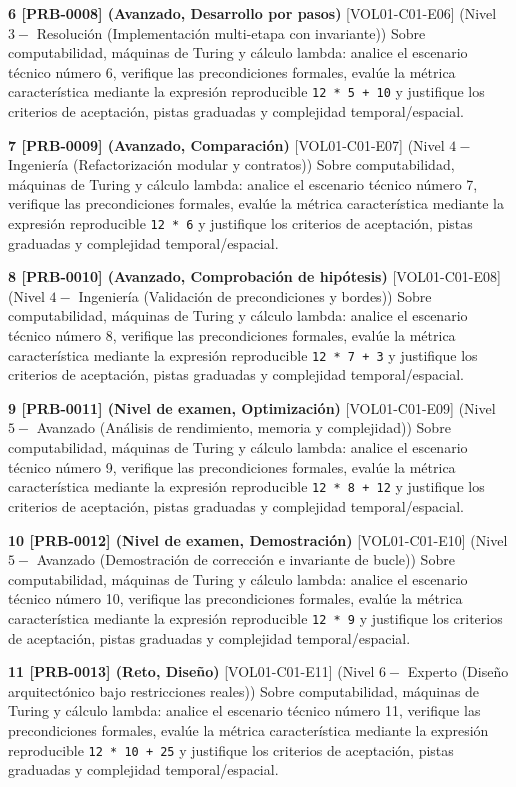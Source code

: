\documentclass{book}
\begin{document}
\begin{tcolorbox}[title={Ejercicios}, studiumworked, breakable]
\noindent\textbf{6 [PRB-0008] (Avanzado, Desarrollo por pasos)}
[VOL01-C01-E06] (Nivel \(3 -\) Resolución (Implementación multi-etapa con invariante)) Sobre computabilidad, máquinas de Turing y cálculo lambda: analice el escenario técnico número 6, verifique las precondiciones formales, evalúe la métrica característica mediante la expresión reproducible \texttt{12 * 5 + 10} y justifique los criterios de aceptación, pistas graduadas y complejidad temporal/espacial.

\noindent\textbf{7 [PRB-0009] (Avanzado, Comparación)}
[VOL01-C01-E07] (Nivel \(4 -\) Ingeniería (Refactorización modular y contratos)) Sobre computabilidad, máquinas de Turing y cálculo lambda: analice el escenario técnico número 7, verifique las precondiciones formales, evalúe la métrica característica mediante la expresión reproducible \texttt{12 * 6} y justifique los criterios de aceptación, pistas graduadas y complejidad temporal/espacial.

\noindent\textbf{8 [PRB-0010] (Avanzado, Comprobación de hipótesis)}
[VOL01-C01-E08] (Nivel \(4 -\) Ingeniería (Validación de precondiciones y bordes)) Sobre computabilidad, máquinas de Turing y cálculo lambda: analice el escenario técnico número 8, verifique las precondiciones formales, evalúe la métrica característica mediante la expresión reproducible \texttt{12 * 7 + 3} y justifique los criterios de aceptación, pistas graduadas y complejidad temporal/espacial.

\noindent\textbf{9 [PRB-0011] (Nivel de examen, Optimización)}
[VOL01-C01-E09] (Nivel \(5 -\) Avanzado (Análisis de rendimiento, memoria y complejidad)) Sobre computabilidad, máquinas de Turing y cálculo lambda: analice el escenario técnico número 9, verifique las precondiciones formales, evalúe la métrica característica mediante la expresión reproducible \texttt{12 * 8 + 12} y justifique los criterios de aceptación, pistas graduadas y complejidad temporal/espacial.

\noindent\textbf{10 [PRB-0012] (Nivel de examen, Demostración)}
[VOL01-C01-E10] (Nivel \(5 -\) Avanzado (Demostración de corrección e invariante de bucle)) Sobre computabilidad, máquinas de Turing y cálculo lambda: analice el escenario técnico número 10, verifique las precondiciones formales, evalúe la métrica característica mediante la expresión reproducible \texttt{12 * 9} y justifique los criterios de aceptación, pistas graduadas y complejidad temporal/espacial.

\noindent\textbf{11 [PRB-0013] (Reto, Diseño)}
[VOL01-C01-E11] (Nivel \(6 -\) Experto (Diseño arquitectónico bajo restricciones reales)) Sobre computabilidad, máquinas de Turing y cálculo lambda: analice el escenario técnico número 11, verifique las precondiciones formales, evalúe la métrica característica mediante la expresión reproducible \texttt{12 * 10 + 25} y justifique los criterios de aceptación, pistas graduadas y complejidad temporal/espacial.


\end{tcolorbox}
\end{document}
